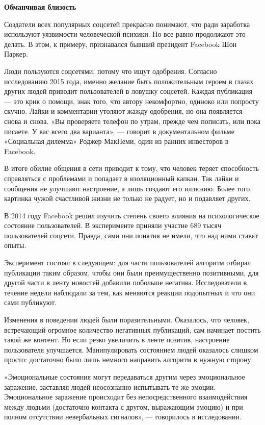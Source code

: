 \textbf{Обманчивая близость}

Создатели всех популярных соцсетей прекрасно понимают, что ради заработка используют уязвимости человеческой психики. Но все равно продолжают это делать. В этом, к примеру, признавался бывший президент Facebook Шон Паркер.

Люди пользуются соцсетями, потому что ищут одобрения. Согласно исследованию 2015 года, именно желание быть положительным героем в глазах других людей приводит пользователей в ловушку соцсетей. Каждая публикация — это крик о помощи, знак того, что автору некомфортно, одиноко или попросту скучно. Лайки и комментарии утоляют жажду одобрения, но она появляется снова и снова. «Вы проверяете телефон по утрам, прежде чем пописать, или пока писаете. У вас всего два варианта», — говорит в документальном фильме «Социальная дилемма» Роджер МакНеми, один из ранних инвесторов в Facebook.

\begin{fancyquotes}
    В итоге обилие общения в сети приводит к тому, что человек теряет способность справляться с проблемами и попадает в изоляционный капкан. Так лайки и сообщения не улучшают настроение, а лишь создают его иллюзию. Более того, картинка чужой счастливой жизни не только не радует, но и подавляет других.
\end{fancyquotes}

В 2014 году Facebook решил изучить степень своего влияния на психологическое состояние пользователей. В эксперименте приняли участие 689 тысяч пользователей соцсети. Правда, сами они понятия не имели, что над ними ставят опыты.

Эксперимент состоял в следующем: для части пользователей алгоритм отбирал публикации таким образом, чтобы они были преимущественно позитивными, для другой части в ленту новостей добавили побольше негатива. Исследователи в течение недели наблюдали за тем, как меняются реакции подопытных и что они сами публикуют.

Изменения в поведении людей были поразительными. Оказалось, что человек, встречающий огромное количество негативных публикаций, сам начинает постить такой же контент. Но если резко увеличить в ленте позитив, настроение пользователя улучшается. Манипулировать состоянием людей оказалось слишком просто: достаточно было лишь немного направить алгоритм в нужную сторону.

«Эмоциональные состояния могут передаваться другим через эмоциональное заражение, заставляя людей неосознанно испытывать те же эмоции. Эмоциональное заражение происходит без непосредственного взаимодействия между людьми (достаточно контакта с другом, выражающим эмоцию) и при полном отсутствии невербальных сигналов», — говорилось в исследовании.

